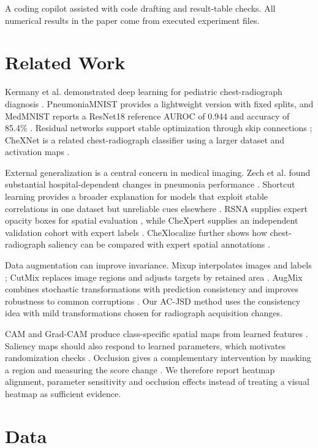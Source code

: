 \documentclass{article}
\begin{document}
A coding copilot assisted with code drafting and result-table checks. All numerical results in the paper come from executed experiment files.

\section{Related Work}
Kermany et al. demonstrated deep learning for pediatric chest-radiograph diagnosis \citep{kermany2018}. PneumoniaMNIST provides a lightweight version with fixed splits, and MedMNIST reports a ResNet18 reference AUROC of 0.944 and accuracy of 85.4\% \citep{yang2023}. Residual networks support stable optimization through skip connections \citep{he2016}; CheXNet is a related chest-radiograph classifier using a larger dataset and activation maps \citep{rajpurkar2017}.

External generalization is a central concern in medical imaging. Zech et al. found substantial hospital-dependent changes in pneumonia performance \citep{zech2018}. Shortcut learning provides a broader explanation for models that exploit stable correlations in one dataset but unreliable cues elsewhere \citep{geirhos2020}. RSNA supplies expert opacity boxes for spatial evaluation \citep{shih2019}, while CheXpert supplies an independent validation cohort with expert labels \citep{irvin2019}. CheXlocalize further shows how chest-radiograph saliency can be compared with expert spatial annotations \citep{saporta2022}.

Data augmentation can improve invariance. Mixup interpolates images and labels \citep{zhang2018}; CutMix replaces image regions and adjusts targets by retained area \citep{yun2019}. AugMix combines stochastic transformations with prediction consistency and improves robustness to common corruptions \citep{hendrycks2019,hendrycks2020}. Our AC-JSD method uses the consistency idea with mild transformations chosen for radiograph acquisition changes.

CAM and Grad-CAM produce class-specific spatial maps from learned features \citep{zhou2016,selvaraju2017}. Saliency maps should also respond to learned parameters, which motivates randomization checks \citep{adebayo2018}. Occlusion gives a complementary intervention by masking a region and measuring the score change \citep{zeiler2014}. We therefore report heatmap alignment, parameter sensitivity and occlusion effects instead of treating a visual heatmap as sufficient evidence.

\section{Data}
\end{document}
